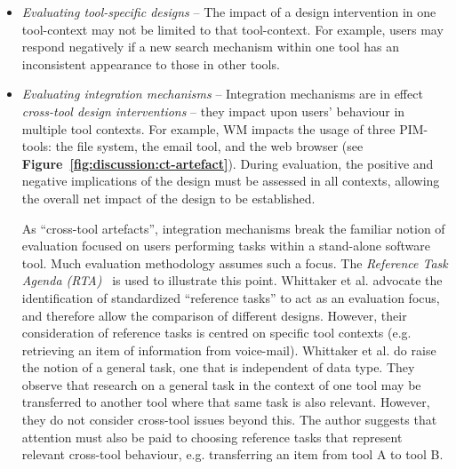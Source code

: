 \begin{itemize}

\item \textit{Evaluating tool-specific designs} -- The impact of a design intervention in one tool-context may not be limited to that tool-context.  For example, users may respond negatively if a new search mechanism within one tool has an inconsistent appearance to those in other tools.  %

\item \textit{Evaluating integration mechanisms} -- Integration mechanisms are in effect \textit{cross-tool design interventions} -- they impact upon users' behaviour in multiple tool contexts. For example, WM impacts the usage of three PIM-tools: the file system, the email tool, and the web browser (see \textbf{Figure~\ref{fig:discussion:ct-artefact}}).  During evaluation, the positive and negative implications of the design must be assessed in all contexts, allowing the overall net impact of the design to be established.

As ``cross-tool artefacts'', integration mechanisms break the familiar notion of evaluation focused on users performing tasks within a stand-alone software tool.  Much evaluation methodology assumes such a focus.  The \textit{Reference Task Agenda (RTA)}~\citep{Whittaker-rta:00} is used to illustrate this point. Whittaker et al. advocate the identification of standardized ``reference tasks'' to act as an evaluation focus, and therefore allow the comparison of different designs.  However, their consideration of reference tasks is centred on specific tool contexts (e.g. retrieving an item of information from voice-mail).  Whittaker et al. do raise the notion of a general task, one that is independent of data type. They observe that research on a general task in the context of one tool may be transferred to another tool where that same task is also relevant. However, they do not consider cross-tool issues beyond this.   The author suggests that attention must also be paid to choosing reference tasks that represent relevant cross-tool behaviour, e.g. transferring an item from tool A to tool B.   %


\end{itemize}

